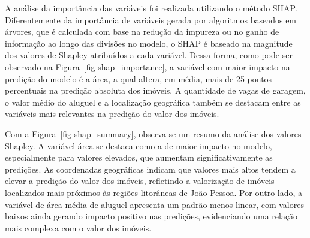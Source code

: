 \documentclass[
  12pt,
  a4paper,
]{scrreprt}
\begin{document}
\vspace{12pt}

A análise da importância das variáveis foi realizada utilizando o método
SHAP. Diferentemente da importância de variáveis gerada por algoritmos
baseados em árvores, que é calculada com base na redução da impureza ou
no ganho de informação ao longo das divisões no modelo, o SHAP é baseado
na magnitude dos valores de Shapley atribuídos a cada variável. Dessa
forma, como pode ser observado na Figura~\ref{fig-shap_importance}, a
variável com maior impacto na predição do modelo é a área, a qual
altera, em média, mais de 25 pontos percentuais na predição absoluta dos
imóveis. A quantidade de vagas de garagem, o valor médio do aluguel e a
localização geográfica também se destacam entre as variáveis mais
relevantes na predição do valor dos imóveis.

\vspace{12pt}

Com a Figura~\ref{fig-shap_summary}, observa-se um resumo da análise dos
valores Shapley. A variável área se destaca como a de maior impacto no
modelo, especialmente para valores elevados, que aumentam
significativamente as predições. As coordenadas geográficas indicam que
valores mais altos tendem a elevar a predição do valor dos imóveis,
refletindo a valorização de imóveis localizados mais próximos às regiões
litorâneas de João Pessoa. Por outro lado, a variável de área média de
aluguel apresenta um padrão menos linear, com valores baixos ainda
gerando impacto positivo nas predições, evidenciando uma relação mais
complexa com o valor dos imóveis.
\end{document}
